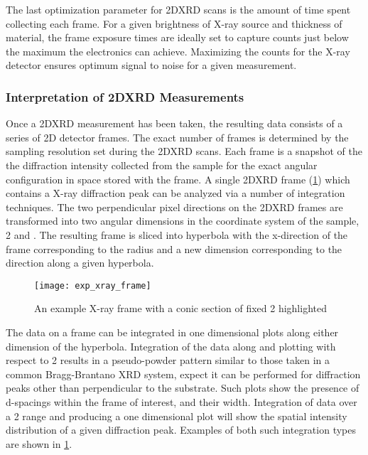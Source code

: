 The last optimization parameter for 2DXRD scans is the amount of time spent collecting each frame.
For a given brightness of X-ray source and thickness of material, the frame exposure times are ideally set to capture counts just below the maximum the electronics can achieve.
Maximizing the counts for the X-ray detector ensures optimum signal to noise for a given measurement.

\subsubsection{Interpretation of 2DXRD Measurements} Once a 2DXRD measurement has been taken, the resulting data consists of a series of 2D detector frames.
The exact number of frames is determined by the sampling resolution set during the 2DXRD scans.
Each frame is a snapshot of the the diffraction intensity collected from the sample for the exact angular configuration in space stored with the frame.
A single 2DXRD frame (\cref{fig:exp_xray_frame}) which contains a X-ray diffraction peak can be analyzed via a number of integration techniques.
The two perpendicular pixel directions on the 2DXRD frames are transformed into two angular dimensions in the coordinate system of the sample, 2\straighttheta{} and \textchi{} \cite{He2009}.
The resulting frame is sliced into hyperbola with the x-direction of the frame corresponding to the radius and a new dimension \textchi{} corresponding to the direction along a given hyperbola.
\begin{figure}
 \centering \texttt{[image: exp\_xray\_frame]}
 \caption[Example 2DXRD frame]{\label{fig:exp_xray_frame}An example X-ray frame with a conic section of fixed 2\straighttheta{} highlighted}
\end{figure}

The data on a frame can be integrated in one dimensional plots along either dimension of the hyperbola.
Integration of the data along \textchi{} and plotting with respect to 2\straighttheta{} results in a pseudo-powder pattern similar to those taken in a common Bragg-Brantano XRD system, expect it can be performed for diffraction peaks other than perpendicular to the substrate.
Such plots show the presence of d-spacings within the frame of interest, and their width.
Integration of data over a 2\straighttheta{} range and producing a one dimensional plot will show the spatial intensity distribution of a given diffraction peak.
Examples of both such integration types are shown in \cref{fig:exp_xray_frame}.

